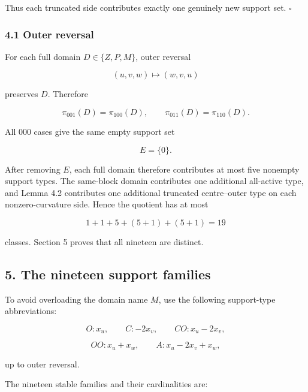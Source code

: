 \documentclass[
  british,
  a4paper,
  11pt]{article}
\newcounter{none} %
\begin{document}
Thus each truncated side contributes exactly one genuinely new support
set. \(\square\)

\subsubsection{4.1 Outer reversal}\label{outer-reversal}

For each full domain \(D\in\{Z,P,M\}\), outer reversal

\[
(u,v,w)\longmapsto(w,v,u)
\tag{4.7}
\]

preserves \(D\). Therefore

\[
\pi_{001}(D)=\pi_{100}(D),
\qquad
\pi_{011}(D)=\pi_{110}(D).
\tag{4.8}
\]

All \(000\) cases give the same empty support set

\[
E=\{0\}.
\tag{4.9}
\]

After removing \(E\), each full domain therefore contributes at most
five nonempty support types. The same-block domain contributes one
additional all-active type, and Lemma 4.2 contributes one additional
truncated centre--outer type on each nonzero-curvature side. Hence the
quotient has at most

\[
1+1+5+(5+1)+(5+1)=19
\tag{4.10}
\]

classes. Section 5 proves that all nineteen are distinct.

\subsection{5. The nineteen support
families}\label{the-nineteen-support-families}

To avoid overloading the domain name \(M\), use the following
support-type abbreviations:

\[
O:x_u,\qquad
C:-2x_v,\qquad
CO:x_u-2x_v,
\]

\[
OO:x_u+x_w,\qquad
A:x_u-2x_v+x_w,
\tag{5.1}
\]

up to outer reversal.

The nineteen stable families and their cardinalities are:
\end{document}
